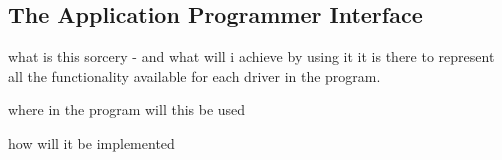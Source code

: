 \subsection{The Application Programmer Interface}
\label{sec:TheApplicationProgrammerInterface}

what is this sorcery - and what will i achieve by using it
it is there to represent all the functionality available for each driver in the program.

where in the program will this be used

how will it be implemented 

